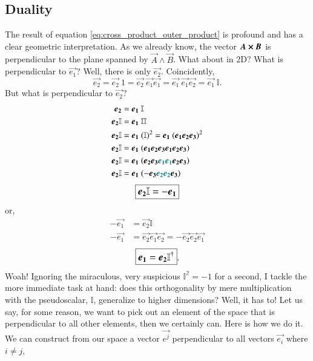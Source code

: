 \subsection{Duality} \label{sec:duality}
The result of equation \eqref{eq:cross_product_outer_product} is profound and has a clear geometric interpretation. As we already know, the vector $ \vec{A}  \cross \vec{B}  $ is perpendicular to the plane spanned by $ \vec{A}  \wedge \vec{B} $. What about in 2D? What is perpendicular to $\vec{e_1}$? Well, there is only $\vec{e_2}$. Coincidently, 
$$ \vec{e_2} = \vec{e_2} \ 1 = \vec{e_2}  \ \vec{e_1} \vec{e_1}= \vec{e_1}  \ \vec{e_1} \vec{e_2} = \vec{e_1}  \ \mathbb{I}.$$
But what is perpendicular to $\vec{e_2}$?
\begin{align*}
\vec{e_2} &= \vec{e_1}  \ \mathbb{I} \\
\vec{e_2} \mathbb{I} &= \vec{e_1}  \ \mathbb{I} \mathbb{I} \\
\vec{e_2} \mathbb{I} &= \vec{e_1}  \ (\mathbb{I})^2=  \vec{e_1}  \ (\vec{e_1} \vec{e_2} \vec{e_3})^2 \\
\vec{e_2} \mathbb{I} &=  \vec{e_1}  \ (\vec{e_1} \vec{e_2} \vec{e_3} \vec{e_1} \vec{e_2} \vec{e_3} )\\
\vec{e_2} \mathbb{I} &=  \vec{e_1}  \ (\vec{e_2} \vec{e_3} \color{teal}{\vec{e_1} \vec{e_1}} \color{black} \vec{e_2} \vec{e_3} )\\
\vec{e_2} \mathbb{I} &=  \vec{e_1}  \ (-  \vec{e_3} \color{teal}{\vec{e_2} \vec{e_2}} \color{black} \vec{e_3} )
\end{align*}
\begin{equation} \label{eq:dual_3d_test_1}
\large\boxed{\vec{e_2} \mathbb{I} =  -\vec{e_1}}
\end{equation}
or,
\begin{align*}
 -\vec{e_1} &=  \vec{e_2} \mathbb{I} \\
 -\vec{e_1} &=\vec{e_2} \vec{e_1} \vec{e_2} = - \vec{e_2} \vec{e_2} \vec{e_1}
\end{align*}
\begin{equation} \label{eq:dual_3d_test_2}
\large\boxed{\vec{e_1} = \vec{e_2} \mathbb{I}^\dagger}.
\end{equation}
Woah! Ignoring the miraculous, very suspicious $\mathbb{I^2} = -1$ for a second, I tackle the more immediate task at hand: does this orthogonality by mere multiplication with the pseudoscalar, $\mathbb{I}$, generalize to higher dimensions? Well, it has to! Let us say, for some reason, we want to pick out an element of the space that is perpendicular to all other elements, then we certainly can. Here is how we do it. We can construct from our space a vector $\vec{e^j}$ perpendicular to all vectors $\vec{e_i}$ where $i \neq j$,
